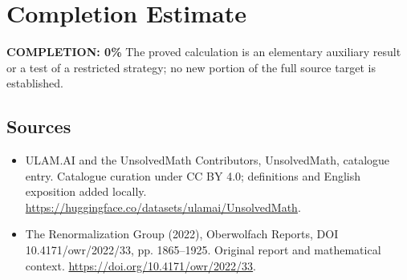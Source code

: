 \documentclass[11pt]{article}
\begin{document}
\section{Completion Estimate}
\noindent\textbf{COMPLETION: 0\%}
The proved calculation is an elementary auxiliary result or a test of a restricted strategy; no new portion of the full source target is established.

\subsection{Sources}
\begin{itemize}
\item[\hypertarget{source:statement:1}{S1}] ULAM.AI and the UnsolvedMath Contributors, UnsolvedMath, catalogue entry. Catalogue curation under CC BY 4.0; definitions and English exposition added locally.
\url{https://huggingface.co/datasets/ulamai/UnsolvedMath}.
\item[\hypertarget{source:statement:2}{S2}] The Renormalization Group (2022), Oberwolfach Reports, DOI 10.4171/owr/2022/33, pp. 1865--1925. Original report and mathematical context.
\url{https://doi.org/10.4171/owr/2022/33}.
\end{itemize}
\label{end:statement}
\end{document}

